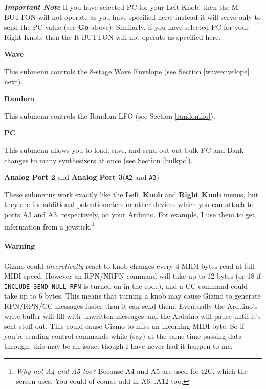 \documentclass{article}
\begin{document}
\begin{description}
	{\bf \textit{Important Note}\quad} If you have selected PC for your Left Knob, then the M BUTTON will not operate as you have specified here: instead it will serve only to send the PC value (see {\bf Go} above).  Similarly, if you have selected PC for your Right Knob, then the R BUTTON will not operate as specified here.
	
	\item{\bf Wave}
	
	This submenu controls the 8-stage Wave Envelope (see Section \ref{waveenvelope} next).

	\item{\bf Random}
	
	This submenu controls the Random LFO (see Section \ref{randomlfo}).
	
	\item{\bf PC}
	
	This submenu allows you to load, save, and send out out bulk PC and Bank changes to many synthesizers at once (see Section \ref{bulkpc}).

	\item{\bf Analog Port 2} and {\bf Analog Port 3}\quad (\texttt{A2} and \texttt{A3})
	
	These submenus work exactly like the {\bf Left Knob} and {\bf Right Knob} menus, but they are for additional potentiometers or other devices which you can attach to ports A3 and A3, respectively, on your Arduino.  For example, I use them to get information from a joystick.\footnote{{\it Why not A4 and A5 too?\quad} Because A4 and A5 are used for I2C, which the screen uses.  You could of course add in A6...A12 too.}
	
	\end{description}
	
\paragraph{Warning} Gizmo could {\it theoretically} react to knob changes every 4 MIDI bytes read at full MIDI speed.  However an RPN/NRPN command will take up to 12 bytes (or 18 if \texttt{INCLUDE\_SEND\_NULL\_RPN} is turned on in the code), and a CC command could take up to 6 bytes.  This means that turning a knob may cause Gizmo to generate RPN/RPN/CC messages faster than it can send them.  Eventually the Arduino's write-buffer will fill with unwritten messages and the Arduino will pause until it's sent stuff out.  This could cause Gizmo to miss an incoming MIDI byte.  So if you're sending control commands while (say) at the same time passing data through, this may be an issue: though I have never had it happen to me.
\end{document}
